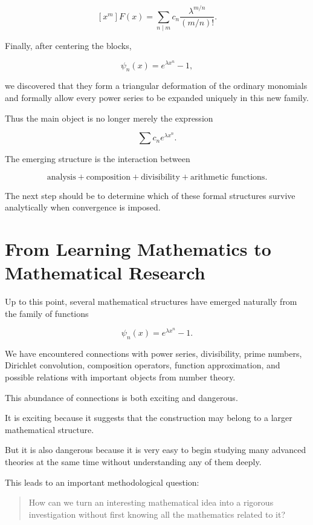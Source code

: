 \[
[x^m]F(x)
=
\sum_{n\mid m}
c_n
\frac{\lambda^{m/n}}{(m/n)!}.
\]

Finally, after centering the blocks,

\[
\psi_n(x)
=
e^{\lambda x^n}-1,
\]

we discovered that they form a triangular deformation of the ordinary
monomials and formally allow every power series to be expanded
uniquely in this new family.

Thus the main object is no longer merely the expression

\[
\sum c_ne^{\lambda x^n}.
\]

The emerging structure is the interaction between

\[
\boxed{
\text{analysis}
+
\text{composition}
+
\text{divisibility}
+
\text{arithmetic functions}.
}
\]

The next step should be to determine which of these formal structures
survive analytically when convergence is imposed.

\section{From Learning Mathematics to Mathematical Research}

Up to this point, several mathematical structures have emerged naturally
from the family of functions

\[
    \psi_n(x)=e^{\lambda x^n}-1.
\]

We have encountered connections with power series, divisibility, prime
numbers, Dirichlet convolution, composition operators, function
approximation, and possible relations with important objects from number
theory.

This abundance of connections is both exciting and dangerous.

It is exciting because it suggests that the construction may belong to a
larger mathematical structure.

But it is also dangerous because it is very easy to begin studying many
advanced theories at the same time without understanding any of them deeply.

This leads to an important methodological question:

\begin{quote}
How can we turn an interesting mathematical idea into a rigorous
investigation without first knowing all the mathematics related to it?
\end{quote}

